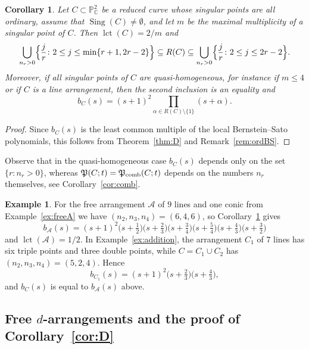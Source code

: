 \documentclass[11pt]{amsart}
\newtheorem{corollary}[theorem]{Corollary}
\theoremstyle{definition}
\newtheorem{example}[theorem]{Example}
\numberwithin{equation}{section}
\newcommand{\PP}{\mathbb{P}}
\newcommand{\CC}{\mathbb{C}}
\newcommand{\cA}{\mathcal{A}}
\newcommand{\Pfrak}{\mathfrak{P}}
\newcommand{\Pcomb}{\mathfrak{P}_{\rm comb}}
\DeclareMathOperator{\Sing}{Sing}
\DeclareMathOperator{\lct}{lct}
\begin{document}
\begin{corollary}\label{cor:arrBS}
Let $C\subset\PP^2_\CC$ be a reduced curve whose singular points are all ordinary, assume that $\Sing(C)\neq\emptyset$, and let $m$ be the maximal multiplicity of a singular point of $C$. Then $\lct(C)=2/m$ and
\[
\bigcup_{n_r>0}\Bigl\{\frac jr\colon 2\le j\le \min\{r+1,2r-2\}\Bigr\}\subseteq R(C)\subseteq\bigcup_{n_r>0}\Bigl\{\frac jr\colon 2\le j\le 2r-2\Bigr\}.
\]
Moreover, if all singular points of $C$ are quasi-homogeneous, for instance if $m\le4$ or if $C$ is a line arrangement, then the second inclusion is an equality and
\[
b_C(s)=(s+1)^2\prod_{\alpha\in R(C)\setminus\{1\}}(s+\alpha).
\]
\end{corollary}

\begin{proof}
Since $b_C(s)$ is the least common multiple of the local Bernstein--Sato polynomials, this follows from Theorem~\ref{thm:D} and Remark~\ref{rem:ordBS}.
\end{proof}

Observe that in the quasi-homogeneous case $b_C(s)$ depends only on the set $\{r\colon n_r>0\}$, whereas $\Pfrak(C;t)=\Pcomb(C;t)$ depends on the numbers $n_r$ themselves, see Corollary~\ref{cor:comb}.

\begin{example}\label{ex:BSarr}
For the free arrangement $\cA$ of $9$ lines and one conic from Example~\ref{ex:freeA} we have $(n_2,n_3,n_4)=(6,4,6)$, so Corollary~\ref{cor:arrBS} gives
\[
b_\cA(s)=(s+1)^2\bigl(s+\tfrac12\bigr)\bigl(s+\tfrac23\bigr)\bigl(s+\tfrac34\bigr)\bigl(s+\tfrac54\bigr)\bigl(s+\tfrac43\bigr)\bigl(s+\tfrac32\bigr)
\]
and $\lct(\cA)=1/2$.
In Example~\ref{ex:addition}, the arrangement $C_1$ of $7$ lines has six triple points and three double points, while $C=C_1\cup C_2$ has $(n_2,n_3,n_4)=(5,2,4)$.
Hence
\[
b_{C_1}(s)=(s+1)^2\bigl(s+\tfrac23\bigr)\bigl(s+\tfrac43\bigr),
\]
and $b_C(s)$ is equal to $b_\cA(s)$ above.
\end{example}

\subsection*{Free \texorpdfstring{$d$}{d}-arrangements and the proof of Corollary~\ref{cor:D}}
\end{document}
